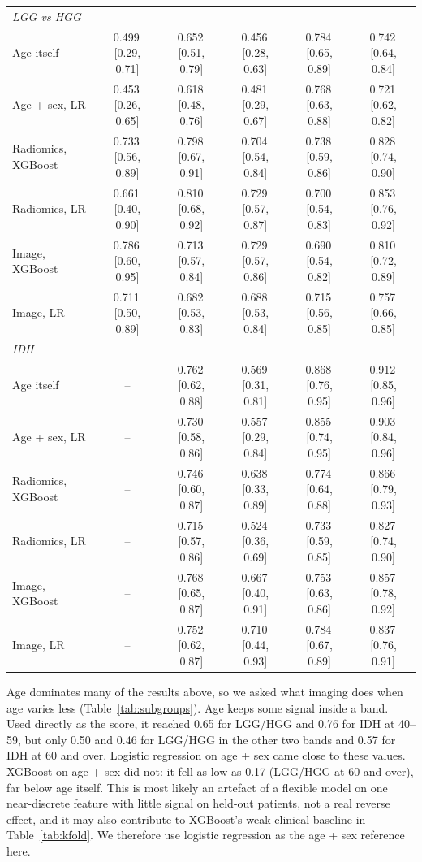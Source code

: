 \documentclass[11pt]{article}
\newcommand{\ci}[2]{\,[#1, #2]}
\begin{document}
\begin{table}[t]
{\begin{tabular}{lccccc}
\midrule
\multicolumn{6}{l}{\emph{LGG vs HGG}} \\
Age itself & 0.499\ci{0.29}{0.71} & 0.652\ci{0.51}{0.79} & 0.456\ci{0.28}{0.63} & 0.784\ci{0.65}{0.89} & 0.742\ci{0.64}{0.84} \\
Age + sex, LR & 0.453\ci{0.26}{0.65} & 0.618\ci{0.48}{0.76} & 0.481\ci{0.29}{0.67} & 0.768\ci{0.63}{0.88} & 0.721\ci{0.62}{0.82} \\
Radiomics, XGBoost & 0.733\ci{0.56}{0.89} & 0.798\ci{0.67}{0.91} & 0.704\ci{0.54}{0.84} & 0.738\ci{0.59}{0.86} & 0.828\ci{0.74}{0.90} \\
Radiomics, LR & 0.661\ci{0.40}{0.90} & 0.810\ci{0.68}{0.92} & 0.729\ci{0.57}{0.87} & 0.700\ci{0.54}{0.83} & 0.853\ci{0.76}{0.92} \\
Image, XGBoost & 0.786\ci{0.60}{0.95} & 0.713\ci{0.57}{0.84} & 0.729\ci{0.57}{0.86} & 0.690\ci{0.54}{0.82} & 0.810\ci{0.72}{0.89} \\
Image, LR & 0.711\ci{0.50}{0.89} & 0.682\ci{0.53}{0.83} & 0.688\ci{0.53}{0.84} & 0.715\ci{0.56}{0.85} & 0.757\ci{0.66}{0.85} \\
\midrule
\multicolumn{6}{l}{\emph{IDH}} \\
Age itself & -- & 0.762\ci{0.62}{0.88} & 0.569\ci{0.31}{0.81} & 0.868\ci{0.76}{0.95} & 0.912\ci{0.85}{0.96} \\
Age + sex, LR & -- & 0.730\ci{0.58}{0.86} & 0.557\ci{0.29}{0.84} & 0.855\ci{0.74}{0.95} & 0.903\ci{0.84}{0.96} \\
Radiomics, XGBoost & -- & 0.746\ci{0.60}{0.87} & 0.638\ci{0.33}{0.89} & 0.774\ci{0.64}{0.88} & 0.866\ci{0.79}{0.93} \\
Radiomics, LR & -- & 0.715\ci{0.57}{0.86} & 0.524\ci{0.36}{0.69} & 0.733\ci{0.59}{0.85} & 0.827\ci{0.74}{0.90} \\
Image, XGBoost & -- & 0.768\ci{0.65}{0.87} & 0.667\ci{0.40}{0.91} & 0.753\ci{0.63}{0.86} & 0.857\ci{0.78}{0.92} \\
Image, LR & -- & 0.752\ci{0.62}{0.87} & 0.710\ci{0.44}{0.93} & 0.784\ci{0.67}{0.89} & 0.837\ci{0.76}{0.91} \\
\bottomrule
\end{tabular}}
\end{table}

Age dominates many of the results above, so we asked what imaging does when age varies less (Table~\ref{tab:subgroups}).
Age keeps some signal inside a band. Used directly as the score, it reached 0.65 for LGG/HGG and 0.76 for IDH at 40--59,
but only 0.50 and 0.46 for LGG/HGG in the other two bands and 0.57 for IDH at 60 and over. Logistic regression on age +
sex came close to these values. XGBoost on age + sex did not: it fell as low as 0.17 (LGG/HGG at 60 and over), far below
age itself. This is most likely an artefact of a flexible model on one near-discrete feature with little signal on
held-out patients, not a real reverse effect, and it may also contribute to XGBoost's weak clinical baseline in
Table~\ref{tab:kfold}. We therefore use logistic regression as the age + sex reference here.
\end{document}
